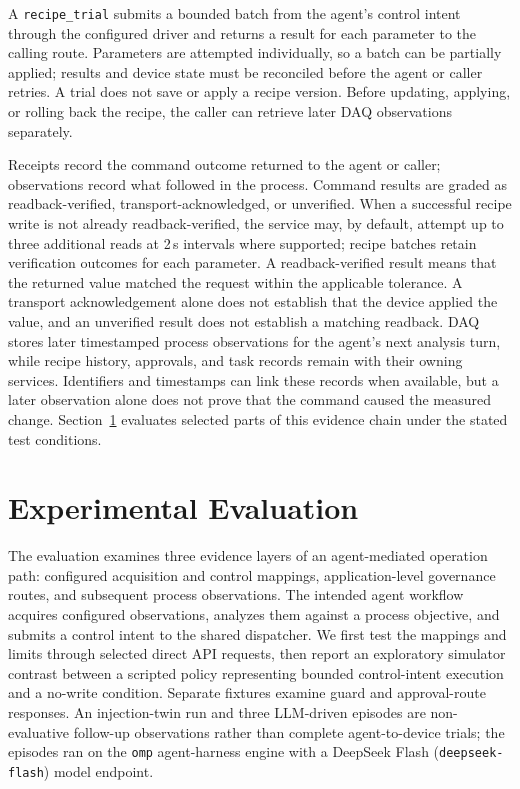 \documentclass[journal]{IEEEtran}
\begin{document}
A \texttt{recipe\_trial} submits a bounded batch from the agent's control intent through the configured
driver and returns a result for each parameter to the calling route. Parameters are attempted
individually, so a batch can be partially applied; results and device state
must be reconciled before the agent or caller retries. A trial does not save or apply a recipe
version. Before updating, applying, or rolling back the recipe, the caller can
retrieve later DAQ observations separately.

Receipts record the command outcome returned to the agent or caller; observations record what followed in
the process. Command results are graded as readback-verified,
transport-acknowledged, or unverified. When a successful recipe write is not
already readback-verified, the service may, by default, attempt up to three additional
reads at 2\,s intervals where supported; recipe batches retain verification
outcomes for each parameter. A readback-verified result means that the
returned value matched the request within the applicable tolerance. A transport
acknowledgement alone does not establish that the device applied the value, and
an unverified result does not establish a matching readback. DAQ stores later
timestamped process observations for the agent's next analysis turn, while
recipe history, approvals, and task records remain with their owning services.
Identifiers and timestamps can link these records when available, but a later
observation alone does not prove that the command caused the measured change.
Section~\ref{sec:eval} evaluates selected parts of this evidence chain under the
stated test conditions.

  \section{Experimental Evaluation}
\label{sec:eval}
The evaluation examines three evidence layers of an agent-mediated operation path: configured acquisition and control mappings, application-level governance routes, and subsequent process observations. The intended agent workflow acquires configured observations, analyzes them against a process objective, and submits a control intent to the shared dispatcher. We first test the mappings and limits through selected direct API requests, then report an exploratory simulator contrast between a scripted policy representing bounded control-intent execution and a no-write condition. Separate fixtures examine guard and approval-route responses. An injection-twin run and three LLM-driven episodes are non-evaluative follow-up observations rather than complete agent-to-device trials; the episodes ran on the \texttt{omp} agent-harness engine with a DeepSeek Flash (\texttt{deepseek-flash}) model endpoint.
\end{document}
